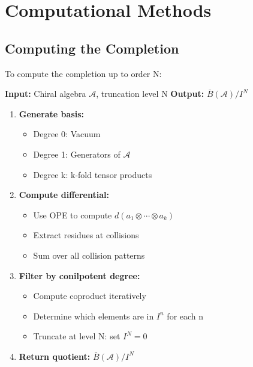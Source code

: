\section{Computational Methods}

\subsection{Computing the Completion}

\begin{algorithm}\label{alg:compute-completion}
To compute the completion up to order N:

\textbf{Input:} Chiral algebra $\mathcal{A}$, truncation level N
\textbf{Output:} $\bar{B}(\mathcal{A})/I^N$

\begin{enumerate}
\item \textbf{Generate basis:}
   \begin{itemize}
   \item Degree 0: Vacuum
   \item Degree 1: Generators of $\mathcal{A}$
   \item Degree k: k-fold tensor products
   \end{itemize}

\item \textbf{Compute differential:}
   \begin{itemize}
   \item Use OPE to compute $d(a_1 \otimes \cdots \otimes a_k)$
   \item Extract residues at collisions
   \item Sum over all collision patterns
   \end{itemize}

\item \textbf{Filter by conilpotent degree:}
   \begin{itemize}
   \item Compute coproduct iteratively
   \item Determine which elements are in $I^n$ for each n
   \item Truncate at level N: set $I^N = 0$
   \end{itemize}

\item \textbf{Return quotient:} $\bar{B}(\mathcal{A})/I^N$
\end{enumerate}
\end{algorithm}

